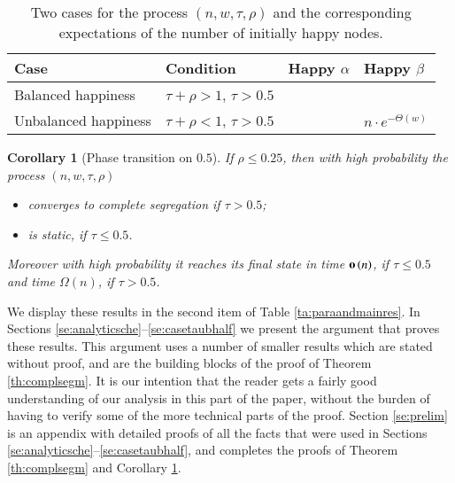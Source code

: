 \documentclass[11pt]{article}
\theoremstyle{plain}
\newtheorem{coro}[thm]{Corollary}
\numberwithin{equation}{subsection}
\newcommand{\smo}[1]{\mathop{\bf o}\/\left({#1}\right)}
\begin{document}
\begin{table}
\caption{Two cases for the process $(n, w, \tau, \rho)$ and the corresponding expectations of
the number of initially happy nodes.}\label{ta:validptwocasesnadcorr}
\colorbox{black!10}{ 
  \begin{tabular}{llll}
\multicolumn{1}{l}{\bf\small Case} &
        \multicolumn{1}{l}{\bf\small Condition}& 
        \multicolumn{1}{l}{\bf\small  \hspace{0.6cm}Happy $\alpha$}& 
    \multicolumn{1}{l}{\bf\small  \hspace{0.6cm}Happy  $\beta$} \\[0.5ex]
\toprule
{\small Balanced happiness\hspace{0.6cm}}&  {\small $\tau +\rho>1$, $\tau>0.5$}  
&\hspace{0.6cm}{\small $n\cdot e^{-\Theta(w)}$} &\hspace{0.6cm}{\small $n\cdot  e^{-\Theta(w)}$} \\[1ex]
{\small Unbalanced happiness\hspace{0.6cm}} &  {\small $\tau +\rho<1$, $\tau>0.5$} &\hspace{0.6cm}{\small $n\cdot \left(1-e^{-\Theta(w)}\right)$}
& \hspace{0.6cm} {\small $n\cdot  e^{-\Theta(w)}$}  \\[0.1ex]
\end{tabular}}
\centering
\end{table}


\begin{coro}[Phase transition on $0.5$]\label{coro:drphasetans}
If $\rho\leq 0.25$, 
then with high probability the process $(n, w, \tau, \rho)$ 
\begin{itemize}
\item converges to complete segregation if $\tau>0.5$;
\item is static, if $\tau\leq 0.5$.
\end{itemize}
Moreover with high probability it 
reaches its final state in time
$\smo{n}$, if $\tau\leq 0.5$
and time $\Omega(n)$, if $\tau> 0.5$.
\end{coro}

We display these results in the second item of Table \ref{ta:paraandmainres}.
In Sections \ref{se:analyticsche}--\ref{se:casetaubhalf} we present the argument that proves these results.
This argument uses a number of smaller results which are stated without proof, and are the building blocks of
the proof of Theorem \ref{th:complsegm}. It is our intention that the reader gets a fairly good understanding
of our analysis in this part of the paper, without the burden of having to verify some of the more technical
parts of the proof. Section \ref{se:prelim} is an appendix with detailed proofs of all the facts that were used in
Sections \ref{se:analyticsche}--\ref{se:casetaubhalf}, and completes the proofs of Theorem \ref{th:complsegm} and
Corollary \ref{coro:drphasetans}.
\end{document}
